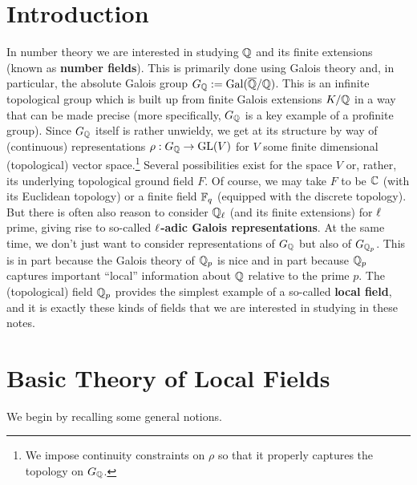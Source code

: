 \documentclass[11pt]{article}
\begin{document}
\section{Introduction}
In number theory we are interested in studying $\mathbb{Q}$ and its finite extensions (known as \textbf{number fields}). This is primarily done using Galois theory and, in particular, the absolute Galois group $G_{\mathbb{Q}}:=\operatorname{Gal}(\overline{\mathbb{Q}}/\mathbb{Q})$. This is an infinite topological group which is built up from finite Galois extensions $K/\mathbb{Q}$ in a way that can be made precise (more specifically, $G_{\mathbb{Q}}$ is a key example of a profinite group). Since $G_{\mathbb{Q}}$ itself is rather unwieldy, we get at its structure by way of (continuous) representations $\rho: G_{\mathbb{Q}}\to\textup{GL}(V)$ for $V$ some finite dimensional (topological) vector space.\footnote{We impose continuity constraints on $\rho$ so that it properly captures the topology on $G_{\mathbb{Q}}$.} Several possibilities exist for the space $V$ or, rather, its underlying topological ground field $F$. Of course, we may take $F$ to be $\mathbb{C}$ (with its Euclidean topology) or a finite field $\mathbb{F}_q$ (equipped with the discrete topology). But there is often also reason to consider $\mathbb{Q}_{\ell}$ (and its finite extensions) for $\ell$ prime, giving rise to so-called \textbf{$\ell$-adic Galois representations}. At the same time, we don't just want to consider representations of $G_{\mathbb{Q}}$ but also of $G_{\mathbb{Q}_p}$. This is in part because the Galois theory of $\mathbb{Q}_p$ is nice and in part because $\mathbb{Q}_p$ captures important ``local'' information about $\mathbb{Q}$ relative to the prime $p$. The (topological) field $\mathbb{Q}_p$ provides the simplest example of a so-called \textbf{local field}, and it is exactly these kinds of fields that we are interested in studying in these notes.

\section{Basic Theory of Local Fields}
We begin by recalling some general notions.
\end{document}
